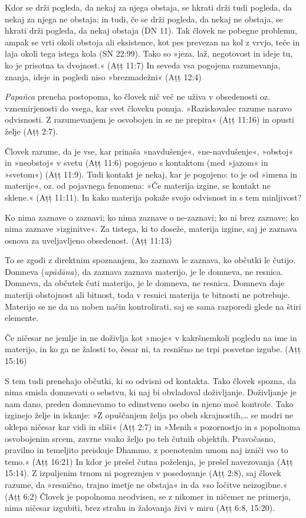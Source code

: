 Kdor se drži pogleda, da nekaj za njega obstaja, se hkrati drži tudi
pogleda, da nekaj za njega ne obstaja; in tudi, če se drži pogleda, da
nekaj ne obstaja, se hkrati drži pogleda, da nekaj obstaja (DN 11). Tak
človek ne pobegne problemu, ampak se vrti okoli obstoja ali eksistence,
kot pes prevezan na kol z vrvjo, teče in laja okoli tega istega kola (SN
22:99). Tako so »jeza, laž, negotovost in ideje tu, ko je prisotna ta
dvojnost.« (Aṭṭ 11:7) In seveda vsa pogojena razumevanja, znanja, ideje
in pogledi niso »brezmadežni« (Aṭṭ 12:4)

\emph{Papañca} preneha postopoma, ko človek nič več ne uživa v
obsedenosti oz. vznemirjenosti do vsega, kar svet človeku ponuja.
»Raziskovalec razume naravo odvisnosti. Z razumevanjem je osvobojen in
se ne prepira« (Aṭṭ 11:16) in opusti želje (Aṭṭ 2:7).

Človek razume, da je vse, kar prinaša »navdušenje«, »ne-navdušenje«,
»obstoj« in »neobstoj« v svetu (Aṭṭ 11:6) pogojeno s kontaktom (med
»jazom« in »svetom«) (Aṭṭ 11:9). Tudi kontakt je nekaj, kar je pogojeno:
to je od »imena in materije«, oz. od pojavnega fenomena: »Če materija
izgine, se kontakt ne sklene.« (Aṭṭ 11:11). In kako materija pokaže
svojo odvisnost in s tem minljivost?

Ko nima zaznave o zaznavi; ko nima zaznave o ne-zaznavi; ko ni brez
zaznave; ko nima zaznave »izginitve«. Za tistega, ki to doseže, materija
izgine, saj je zaznava osnova za uveljavljeno obsedenost. (Aṭṭ 11:13)

To se zgodi z direktnim spoznanjem, ko zaznava le zaznava, ko občutki le
čutijo. Domneva (\emph{upādāna}), da zaznava zaznava materijo, je le
domneva, ne resnica. Domneva, da občutek čuti materijo, je le domneva,
ne resnica. Domneva daje materiji obstojnost ali bitnost, toda v resnici
materija te bitnosti ne potrebuje. Materijo se ne da na noben način
kontrolirati, saj se sama razporedi glede na štiri elemente.

Če ničesar ne jemlje in ne doživlja kot »moje« v kakršnemkoli pogledu na
ime in materijo, in ko ga ne žalosti to, česar ni, ta resnično ne trpi
posvetne izgube. (Aṭṭ 15:16)

S tem tudi prenehajo občutki, ki so odvisni od kontakta. Tako človek
spozna, da nima smisla domnevati o sebstvu, ki naj bi obvladoval
doživljanje. Doživljanje je nam dano, preden domnevamo to edinstveno
osebo in njeno moč kontrole. Tako izginejo želje in iskanje: »Z
opuščanjem želja po obeh skrajnostih,\ldots{} se modri ne oklepa ničesar
kar vidi in sliši« (Aṭṭ 2:7) in »Menih s pozornostjo in s popolnoma
osvobojenim srcem, zavrne vsako željo po teh čutnih objektih.
Pravočasno, pravilno in temeljito preiskuje Dhammo, z poenotenim umom
naj izniči vso to temo.« (Aṭṭ 16:21) In kdor je prešel čutna poželenja,
je prešel navezovanja (Aṭṭ 15:14). Z izpuljenim trnom ni pogreznjen v
posedovanje (Aṭṭ 2:8), saj človek razume, da »resnično, trajno imetje ne
obstaja« in da »so ločitve neizogibne.« (Aṭṭ 6:2) Človek je popolnoma
neodvisen, se z nikomer in ničemer ne primerja, nima ničesar izgubiti,
brez strahu in žalovanja živi v miru (Aṭṭ 6:8, 15:20).

